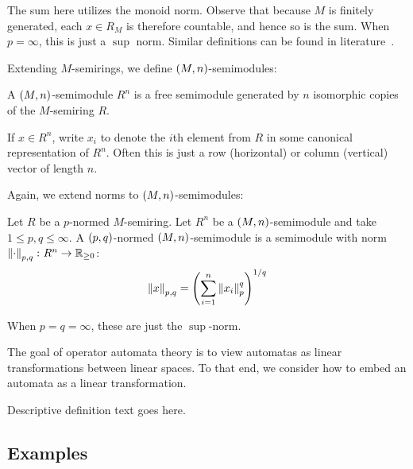 \documentclass[12pt]{article}
\begin{document}
The sum here utilizes the monoid norm.
Observe that because \(M\) is finitely generated,
each \(x \in R_M\) is therefore countable,
and hence so is the sum.
When \(p = \infty\), this is just a \(\sup\) norm.
Similar definitions can be found in literature~\cite{kudlek2000lemmata}.

Extending \(M\)-semirings,
we define \(\left(M, n\right)\)-semimodules:

\begin{definition}
  A \(\left(M, n\right)\)-semimodule \(R ^n\)
  is a free semimodule generated by \(n\) isomorphic copies of
  the \(M\)-semiring \(R\).
\end{definition}

If \(x \in R ^n\), write \(x_i\) to denote the \(i\)th element from
\(R\) in some canonical representation of \(R ^n\).
Often this is just a row (horizontal) or column (vertical)
vector of length \(n\).

Again, we extend norms to \(\left(M, n\right)\)-semimodules:

\begin{definition}
  Let \(R\) be a \(p\)-normed \(M\)-semiring.
  Let \(R ^n\) be a \(\left(M, n\right)\)-semimodule
  and take \(1 \leq p, q \leq \infty\).
  A \(\left(p, q\right)\)-normed \(\left(M, n\right)\)-semimodule
  is a semimodule with norm \(\left\lVert\cdot\right\rVert_{p, q} \colon R^n \to \mathbb{R}_{\geq 0}\):
  \begin{align*}
    \left\lVert x\right\rVert_{p, q}
      = \left(\sum_{i = 1}^{n} \left\lVert x_i\right\rVert_{p}^q\right)^{1 / q}
  \end{align*}
\end{definition}

When \(p = q = \infty\), these are just the \(\sup\)-norm.

The goal of operator automata theory is to view automatas
as linear transformations between linear spaces.
To that end, we consider how to embed an automata as a linear transformation.

\begin{definition}
  Descriptive definition text goes here.
\end{definition}



\subsection{Examples}
\end{document}

